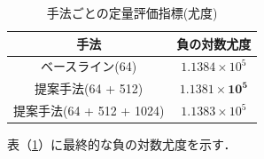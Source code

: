 \documentclass[10pt, twocolumn]{jarticle}
\begin{document}
\begin{table}[h]
    \begin{center}
    \caption{\small 手法ごとの定量評価指標(尤度)}
    \begin{tabular}{|c||c|} \hline
      \small 手法 & \small 負の対数尤度 \\ \hline \hline
      \small ベースライン(64) & \small $1.1384 \times 10^5 $ \\ \hline
      \small 提案手法(64 + 512) & \small $\bm{1.1381 \times 10^5 }$ \\ \hline
      \small 提案手法(64 + 512 + 1024) & \small $1.1383 \times 10^5$ \\ \hline
    \end{tabular}
    \label{table:evaluation}
    \end{center}
  \end{table}
\normalsize

表（\ref{table:evaluation}）に最終的な負の対数尤度を示す．

\end{document}
